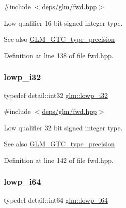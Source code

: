 {\ttfamily \#include $<$\hyperlink{fwd_8hpp}{deps/glm/fwd.\+hpp}$>$}

Low qualifier 16 bit signed integer type. \begin{DoxySeeAlso}{See also}
\hyperlink{group__gtc__type__precision}{G\+L\+M\+\_\+\+G\+T\+C\+\_\+type\+\_\+precision} 
\end{DoxySeeAlso}


Definition at line 138 of file fwd.\+hpp.

\mbox{\label{group__gtc__type__precision_ga70fd34e8b8cffc92739161284ed77328}} 
\subsubsection{\texorpdfstring{lowp\+\_\+i32}{lowp\_i32}}
{\footnotesize\ttfamily typedef detail\+::int32 \hyperlink{group__gtc__type__precision_ga70fd34e8b8cffc92739161284ed77328}{glm\+::lowp\+\_\+i32}}



{\ttfamily \#include $<$\hyperlink{fwd_8hpp}{deps/glm/fwd.\+hpp}$>$}

Low qualifier 32 bit signed integer type. \begin{DoxySeeAlso}{See also}
\hyperlink{group__gtc__type__precision}{G\+L\+M\+\_\+\+G\+T\+C\+\_\+type\+\_\+precision} 
\end{DoxySeeAlso}


Definition at line 142 of file fwd.\+hpp.

\mbox{\label{group__gtc__type__precision_ga1f4ded25f71c0f3b4518936d50b54b6e}} 
\subsubsection{\texorpdfstring{lowp\+\_\+i64}{lowp\_i64}}
{\footnotesize\ttfamily typedef detail\+::int64 \hyperlink{group__gtc__type__precision_ga1f4ded25f71c0f3b4518936d50b54b6e}{glm\+::lowp\+\_\+i64}}



